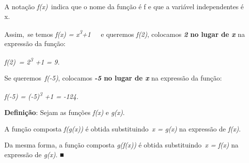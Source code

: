 \documentclass[12pt]{article}
\begin{document}
\begin{enumerate}[label*={\fontsize{14pt}{14pt}\selectfont \textbf{\arabic*.}}]
\begin{justify}
A notação \textit{f(x)}\  indica que o nome da função é f e que a variável independentes é x. 
\end{justify}\par

\begin{justify}
Assim,\  se temos \textit{f(x) = x\textsuperscript{3}+1}\ \ \ e queremos  \textit{f(2)}, colocamos \textbf{\textit{2} no lugar de \textit{x}} na expressão da função:
\end{justify}\par

\begin{justify}
\textit{f(2)\ =  2\textsuperscript{3} +1 = 9.}
\end{justify}\par

\begin{justify}
Se queremos\  \textit{f(-5)}, colocamos \textbf{\textit{-5} no lugar de \textit{x}} na expressão da função:
\end{justify}\par

\begin{justify}
\textit{f(-5) = (-5)\textsuperscript{3} +1 = -124.}
\end{justify}\par

\par 
\begin{justify}
\textbf{Definição}: Sejam as funções \textit{f(x)} e \textit{g(x)}. 
\end{justify}\par

\begin{justify}
A função composta \textit{f(g(x))} é obtida substituindo\  \textit{x = g(x)} na expressão de \textit{f(x)}.
\end{justify}\par

\begin{adjustwidth}{0.89in}{0.0in}
\begin{justify}
Da mesma forma, a função composta \textit{g(f(x))} é obtida substituindo\  \textit{x = f(x)} na expressão de \textit{g(x)}. ■
\end{justify}\par


\end{adjustwidth}
\end{enumerate}
\end{document}
